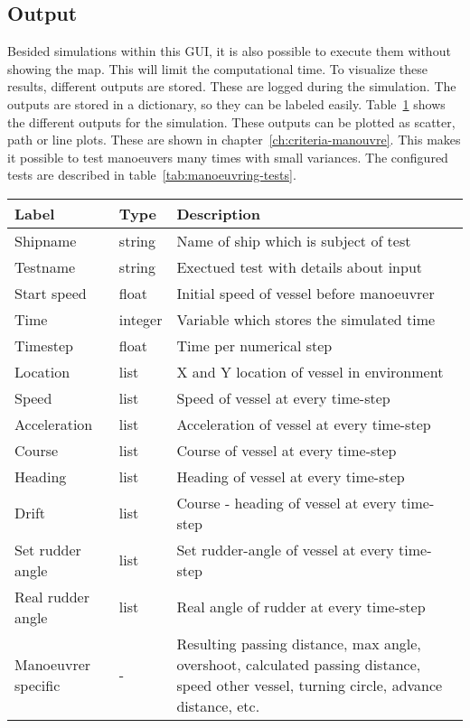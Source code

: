 \subsection{Output}
Besided simulations within this GUI, it is also possible to execute them without showing the map. This will limit the computational time. 
To visualize these results, different outputs are stored. These are logged during the simulation. The outputs are stored in a dictionary, so they can be labeled easily. Table~\ref{tab:output-manoeuvers} shows the different outputs for the simulation. These outputs can be plotted as scatter, path or line plots. These are shown in chapter~\ref{ch:criteria-manouvre}.
This makes it possible to test manoeuvers many times with small variances. The configured tests are described in table~\ref{tab:manoeuvring-tests}.

\begin{table}[p]
	\centering
	\begin{tabular}{p{}|p{}|p{}}
		\toprule
		Label & Type & Description \\
		\midrule
		Shipname & string & Name of ship which is subject of test \\
		Testname & string & Exectued test with details about input \\
		Start speed & float & Initial speed of vessel before manoeuvrer \\
		Time & integer & Variable which stores the simulated time \\
		Timestep & float & Time per numerical step \\
		Location & list & X and Y location of vessel in environment \\
		Speed & list & Speed of vessel at every time-step \\
		Acceleration & list & Acceleration of vessel at every time-step \\
		Course & list & Course of vessel at every time-step \\
		Heading & list & Heading of vessel at every time-step \\
		Drift & list & Course - heading of vessel at every time-step \\
		Set rudder angle & list & Set rudder-angle of vessel at every time-step \\
		Real rudder angle & list & Real angle of rudder at every time-step \\
		Manoeuvrer specific & - & Resulting passing distance, max angle, overshoot, calculated passing distance, speed other vessel, turning circle, advance distance, etc.\\
		\bottomrule
	\end{tabular}
	
	\label{tab:output-manoeuvers}
\end{table}

